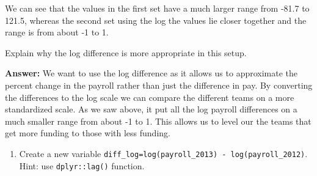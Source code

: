 \documentclass[
]{article}
\newenvironment{Shaded}{\begin{snugshade}}{\end{snugshade}}
\newcommand{\CommentTok}[1]{\textcolor[rgb]{0.56,0.35,0.01}{\textit{#1}}}
\newcommand{\ConstantTok}[1]{\textcolor[rgb]{0.00,0.00,0.00}{#1}}
\newcommand{\DecValTok}[1]{\textcolor[rgb]{0.00,0.00,0.81}{#1}}
\newcommand{\FunctionTok}[1]{\textcolor[rgb]{0.00,0.00,0.00}{#1}}
\newcommand{\NormalTok}[1]{#1}
\newcommand{\OtherTok}[1]{\textcolor[rgb]{0.56,0.35,0.01}{#1}}
\newcommand{\SpecialCharTok}[1]{\textcolor[rgb]{0.00,0.00,0.00}{#1}}
\providecommand{\tightlist}{%
  \setlength{\itemsep}{0pt}\setlength{\parskip}{0pt}}
\begin{document}
\begin{Shaded}
\end{Shaded}

We can see that the values in the first set have a much larger range
from -81.7 to 121.5, whereas the second set using the log the values lie
closer together and the range is from about -1 to 1.

Explain why the log difference is more appropriate in this setup.

\textbf{Answer:} We want to use the log difference as it allows us to
approximate the percent change in the payroll rather than just the
difference in pay. By converting the differences to the log scale we can
compare the different teams on a more standardized scale. As we saw
above, it put all the log payroll differences on a much smaller range
from about -1 to 1. This allows us to level our the teams that get more
funding to those with less funding.

\begin{enumerate}
\def\labelenumi{\roman{enumi}.}
\setcounter{enumi}{1}
\tightlist
\item
  Create a new variable
  \texttt{diff\_log=log(payroll\_2013)\ -\ log(payroll\_2012)}. Hint:
  use \texttt{dplyr::lag()} function.
\end{enumerate}

\begin{Shaded}
\end{Shaded}
\end{document}
